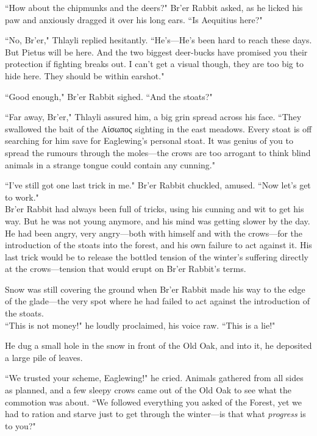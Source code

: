 ``How about the chipmunks and the deers?" Br'er Rabbit asked, as he licked his paw and anxiously dragged it over his long ears.
``Is Aequitius here?"

``No, Br'er," Thlayli replied hesitantly.
``He's---He's been hard to reach these days.
But Pietus will be here.
And the two biggest deer-bucks have promised you their protection if fighting breaks out. %
I can't get a visual though, they are too big to hide here.
They should be within earshot."

``Good enough," Br'er Rabbit sighed.
``And the stoats?"

``Far away, Br'er," Thlayli assured him, a big grin spread across his face.
``They swallowed the bait of the Αίσωπος sighting in the east meadows.
Every stoat is off searching for him save for Eaglewing's personal stoat.
It was genius of you to spread the rumours through the moles---the crows are too arrogant to think blind animals in a strange tongue could contain any cunning."

``I've still got one last trick in me." Br'er Rabbit chuckled, amused.
``Now let's get to work."\\

Br'er Rabbit had always been full of tricks, using his cunning and wit to get his way.
But he was not young anymore, and his mind was getting slower by the day.
He had been angry, very angry---both with himself and with the crows---for the introduction of the stoats into the forest, and his own failure to act against it.
His last trick would be to release the bottled tension of the winter's suffering directly at the crows---tension that would erupt on Br'er Rabbit's terms.

Snow was still covering the ground when Br'er Rabbit made his way to the edge of the glade---the very spot where he had failed to act against the introduction of the stoats.\\

``This is not money!" he loudly proclaimed, his voice raw.
``This is a lie!"

He dug a small hole in the snow in front of the Old Oak, and into it, he deposited a large pile of leaves.

``We trusted your scheme, Eaglewing!" he cried.
Animals gathered from all sides as planned, and a few sleepy crows came out of the Old Oak to see what the commotion was about.
``We followed everything you asked of the Forest, yet we had to ration and starve just to get through the winter---is that what \textit{progress} is to you?"

